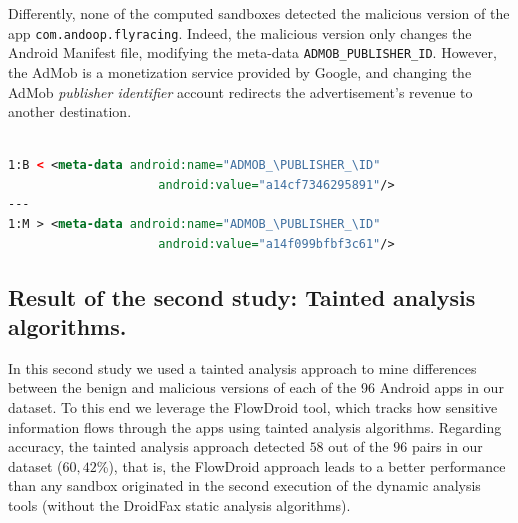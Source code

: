 
Differently, none of the computed sandboxes detected the malicious version
of the app \texttt{com.andoop.flyracing}. Indeed,
the malicious version {\color{red}only} changes the
Android Manifest file, modifying the meta-data \texttt{ADMOB\_PUBLISHER\_ID}.
However, the AdMob is a monetization service provided by Google, and changing the
AdMob \emph{publisher identifier} account redirects the advertisement's
revenue to another destination. 

\begin{lstlisting}[caption={Diff in the file \texttt{com.andoop.flyracing}
      AndroidManifest file of the malicious version.
      \texttt{B} stands for
      the benign version, while \texttt{M} stands for the malign version.}, language=XML,
    basicstyle=\fontsize{8}{6}\selectfont\ttfamily,label={lst:app65b}]

1:B < <meta-data android:name="ADMOB_\PUBLISHER_\ID"
                     android:value="a14cf7346295891"/>
---
1:M > <meta-data android:name="ADMOB_\PUBLISHER_\ID"
                     android:value="a14f099bfbf3c61"/>
\end{lstlisting}


\subsection{Result of the second study: Tainted analysis algorithms.}\label{sec:res-ss}

In this second study we used a tainted analysis approach to mine differences between the benign and malicious versions of each of the 96 Android apps in our dataset. To this end we leverage the FlowDroid tool, which tracks how sensitive information flows through the apps using tainted analysis algorithms. Regarding accuracy, the tainted analysis approach detected $58$ out of the $96$ pairs in our dataset ($60,42$\%), that is, the FlowDroid approach leads to a better performance than any sandbox originated in the second execution of the dynamic analysis tools (without the DroidFax static analysis algorithms).



